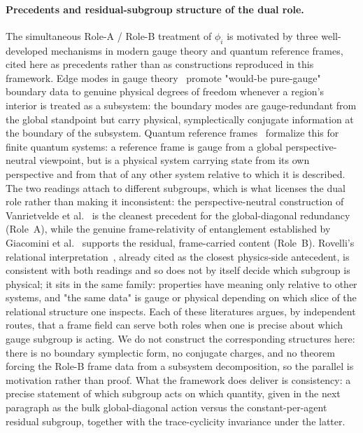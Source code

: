 \documentclass[11pt]{article}
\begin{document}
\paragraph{Precedents and residual-subgroup structure of the dual role.}
\label{sec:dual_role_rigor}
The simultaneous Role-A / Role-B treatment of $\phi_i$ is motivated by three well-developed mechanisms in modern gauge theory and quantum reference frames, cited here as precedents rather than as constructions reproduced in this framework. Edge modes in gauge theory~\cite{DonnellyFreidel2016} promote "would-be pure-gauge" boundary data to genuine physical degrees of freedom whenever a region's interior is treated as a subsystem: the boundary modes are gauge-redundant from the global standpoint but carry physical, symplectically conjugate information at the boundary of the subsystem. Quantum reference frames~\cite{BartlettRudolphSpekkens2007, Vanrietvelde2020, giacomini2019qrf} formalize this for finite quantum systems: a reference frame is gauge from a global perspective-neutral viewpoint, but is a physical system carrying state from its own perspective and from that of any other system relative to which it is described. The two readings attach to different subgroups, which is what licenses the dual role rather than making it inconsistent: the perspective-neutral construction of Vanrietvelde et al.~\cite{Vanrietvelde2020} is the cleanest precedent for the global-diagonal redundancy (Role~A), while the genuine frame-relativity of entanglement established by Giacomini et al.~\cite{giacomini2019qrf} supports the residual, frame-carried content (Role~B). Rovelli's relational interpretation~\cite{Rovelli1996}, already cited as the closest physics-side antecedent, is consistent with both readings and so does not by itself decide which subgroup is physical; it sits in the same family: properties have meaning only relative to other systems, and "the same data" is gauge or physical depending on which slice of the relational structure one inspects. Each of these literatures argues, by independent routes, that a frame field can serve both roles when one is precise about which gauge subgroup is acting. We do not construct the corresponding structures here: there is no boundary symplectic form, no conjugate charges, and no theorem forcing the Role-B frame data from a subsystem decomposition, so the parallel is motivation rather than proof. What the framework does deliver is consistency: a precise statement of which subgroup acts on which quantity, given in the next paragraph as the bulk global-diagonal action versus the constant-per-agent residual subgroup, together with the trace-cyclicity invariance under the latter.
\end{document}
